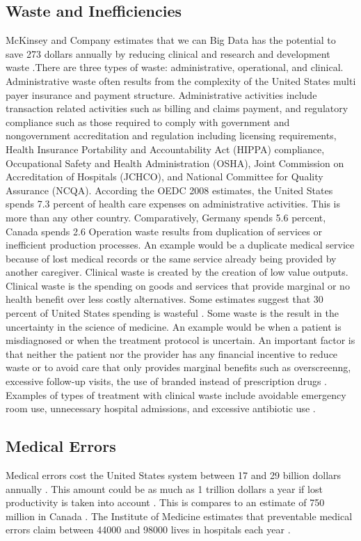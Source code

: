 \documentclass[sigconf]{acmart}
\begin{document}
\subsection{Waste and Inefficiencies}
McKinsey and Company estimates that we can Big Data has the potential to save 273 dollars annually by reducing clinical and research and development waste \cite{springer}.There are three types of waste: administrative, operational, and clinical. 
Administrative waste often results from the complexity of the United States multi payer insurance and payment structure.  Administrative activities include transaction related activities such as billing and claims payment, and regulatory compliance such as those required to comply with government and nongovernment accreditation and regulation including licensing requirements, Health Insurance Portability and Accountability Act (HIPPA) compliance, Occupational Safety and Health Administration (OSHA),  Joint Commission on Accreditation of Hospitals (JCHCO), and National Committee for Quality Assurance (NCQA).  According the OEDC 2008 estimates, the United States spends 7.3 percent of health care expenses on administrative activities. This is more than any other country. Comparatively, Germany spends 5.6 percent, Canada spends 2.6%
 Operation waste results from duplication of services or inefficient production processes.  An example would be a duplicate medical service because of lost medical records or the same service already being provided by another caregiver.
Clinical waste is created by the creation of low value outputs. Clinical waste is the spending on goods and services that provide marginal or no health benefit over less costly alternatives.  Some estimates suggest that 30 percent of United States spending is wasteful \cite{milbank}.  Some waste is the result in the uncertainty in the science of medicine. An example would be when a patient is misdiagnosed or when the treatment protocol is uncertain.  An important factor is that neither the patient nor the provider has any financial incentive to reduce waste or to avoid care that only provides marginal benefits such as overscreenng, excessive follow-up visits, the use of branded instead of prescription drugs \cite{milbank}.  Examples of types of treatment with clinical waste include avoidable emergency room use, unnecessary hospital admissions, and excessive antibiotic use \cite{milbank}. 
\subsection{Medical Errors}
Medical errors cost the United States system between 17 and 29 billion dollars annually \cite{Milman}. This amount could be as much as 1 trillion dollars a year if lost productivity is taken into account \cite{www-google-pracfus}. This is compares to an estimate of 750 million in Canada \cite{Milman}.  The Institute of Medicine estimates that preventable medical errors claim between 44000 and 98000 lives in hospitals each year \cite{milbank}.
\end{document}
